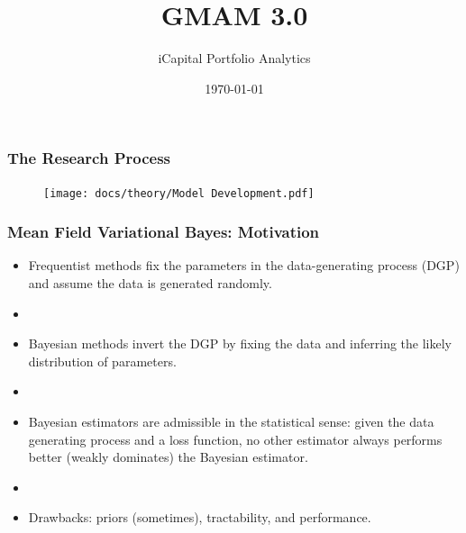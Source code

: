\documentclass[10pt, compress]{beamer}
\author[Tepper]{iCapital Portfolio Analytics}
\title{\Large \bf GMAM 3.0}
\date{\today}
\begin{document}
\newcommand{\tstar}{\ensuremath{^\text{***}}}
\newcommand{\dstar}{\ensuremath{^\text{**}}}
\newcommand{\ostar}{\ensuremath{^\text{*}}}
\maketitle



\begin{frame}[fragile]
\frametitle{The Research Process}
\begin{figure}
	\centering
	\texttt{[image: docs/theory/Model Development.pdf]}\\
    \bigskip
\end{figure}

\end{frame}


\begin{frame}[fragile]
\frametitle{Mean Field Variational Bayes: Motivation} \label{fr:motivation}
\begin{itemize}
    \item Frequentist methods fix the parameters in the data-generating process (DGP) and assume the data is generated randomly.
    \item []
    \item Bayesian methods invert the DGP by fixing the data and inferring the likely distribution of parameters.
    \item []
    \item Bayesian estimators are admissible in the statistical sense: given the data generating process and a loss function, no other estimator always performs better (weakly dominates) the Bayesian estimator.
    \item []
    \item Drawbacks: priors (sometimes), tractability, and performance.
\end{itemize}
\end{frame}
\end{document}

